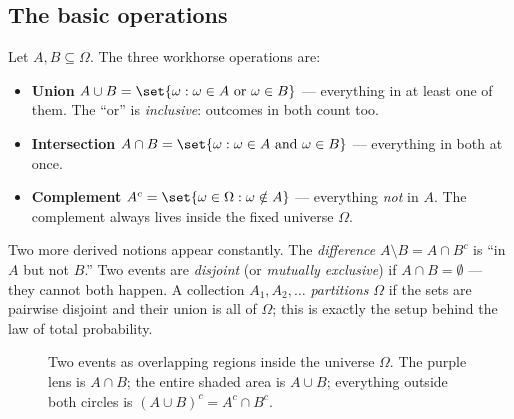 \subsection{The basic operations}

Let $A, B \subseteq \Omega$. The three workhorse operations are:
\begin{itemize}
  \item \textbf{Union} $A \cup B = \set{\omega : \omega \in A \text{ or }
        \omega \in B}$ --- everything in at least one of them. The ``or'' is
        \emph{inclusive}: outcomes in both count too.
  \item \textbf{Intersection} $A \cap B = \set{\omega : \omega \in A \text{
        and } \omega \in B}$ --- everything in both at once.
  \item \textbf{Complement} $A^c = \set{\omega \in \Omega : \omega \notin A}$
        --- everything \emph{not} in $A$. The complement always lives inside
        the fixed universe $\Omega$.
\end{itemize}
Two more derived notions appear constantly. The \emph{difference}
$A \setminus B = A \cap B^c$ is ``in $A$ but not $B$.'' Two events are
\emph{disjoint} (or \emph{mutually exclusive}) if $A \cap B = \emptyset$ ---
they cannot both happen. A collection $A_1, A_2, \dots$ \emph{partitions}
$\Omega$ if the sets are pairwise disjoint and their union is all of $\Omega$;
this is exactly the setup behind the law of total probability.

\begin{figure}[H]
\centering
{}
\caption{Two events as overlapping regions inside the universe $\Omega$. The
purple lens is $A \cap B$; the entire shaded area is $A \cup B$; everything
outside both circles is $(A \cup B)^c = A^c \cap B^c$.}
\label{ch39:venn}
\end{figure}

